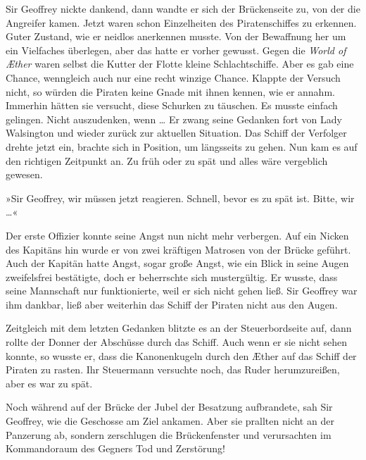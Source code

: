 \bigpar

Sir Geoffrey nickte dankend, dann wandte er sich der Brückenseite
zu, von der die Angreifer kamen. Jetzt waren schon Einzelheiten des
Piratenschiffes zu erkennen. Guter Zustand, wie er neidlos
anerkennen musste. Von der Bewaffnung her um ein Vielfaches
überlegen, aber das hatte er vorher gewusst. Gegen die \textit{World of
Æther} waren selbst die Kutter der Flotte kleine Schlachtschiffe.
Aber es gab eine Chance, wenngleich auch nur eine recht winzige
Chance. Klappte der Versuch nicht, so würden die Piraten keine
Gnade mit ihnen kennen, wie er annahm. Immerhin hätten sie
versucht, diese Schurken zu täuschen. Es musste einfach gelingen.
Nicht auszudenken, wenn \ldots{} Er zwang seine Gedanken fort von Lady
Walsington und wieder zurück zur aktuellen Situation. Das Schiff
der Verfolger drehte jetzt ein, brachte sich in Position, um
längsseits zu gehen. Nun kam es auf den richtigen Zeitpunkt an. Zu
früh oder zu spät und alles wäre vergeblich gewesen.

\bigpar

»Sir Geoffrey, wir müssen jetzt reagieren. Schnell, bevor es zu
spät ist. Bitte, wir \ldots{}«

Der erste Offizier konnte seine Angst nun nicht mehr verbergen. Auf
ein Nicken des Kapitäns hin wurde er von zwei kräftigen Matrosen
von der Brücke geführt. Auch der Kapitän hatte Angst, sogar große
Angst, wie ein Blick in seine Augen zweifelsfrei bestätigte, doch
er beherrschte sich mustergültig. Er wusste, dass seine Mannschaft
nur funktionierte, weil er sich nicht gehen ließ. Sir Geoffrey war
ihm dankbar, ließ aber weiterhin das Schiff der Piraten nicht aus
den Augen.

\bigpar


Zeitgleich mit dem letzten Gedanken blitzte es an der
Steuerbordseite auf, dann rollte der Donner der Abschüsse durch das
Schiff. Auch wenn er sie nicht sehen konnte, so wusste er, dass die
Kanonenkugeln durch den Æther auf das Schiff der Piraten zu rasten.
Ihr Steuermann versuchte noch, das Ruder herumzureißen, aber es war
zu spät.

Noch während auf der Brücke der Jubel der Besatzung aufbrandete,
sah Sir Geoffrey, wie die Geschosse am Ziel ankamen. Aber sie
prallten nicht an der Panzerung ab, sondern zerschlugen die
Brückenfenster und verursachten im Kommandoraum des Gegners Tod und
Zerstörung!

